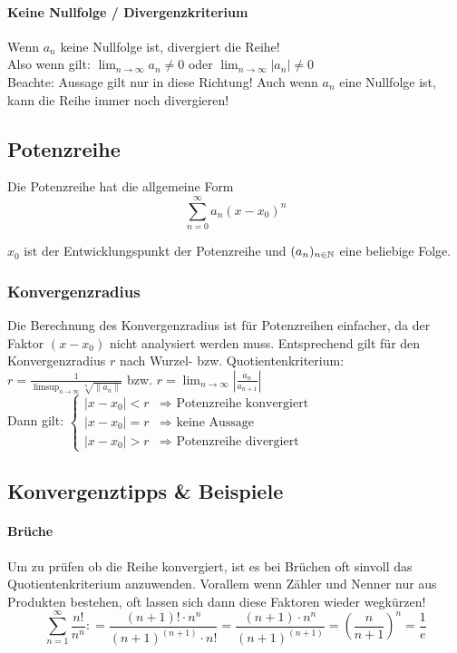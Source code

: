 \paragraph{Keine Nullfolge / Divergenzkriterium}
\vspace{-0.2cm}
Wenn $a_n$ keine Nullfolge ist, divergiert die Reihe! \\
Also wenn gilt: $\lim_{n \to \infty} a_n \neq 0$ oder $\lim_{n \to \infty} |a_n| \neq 0$ \\
Beachte: Aussage gilt nur in diese Richtung! Auch wenn $a_n$ eine Nullfolge ist, kann die Reihe immer noch divergieren!

\subsection{Potenzreihe}
\vspace{-0.2cm}
Die Potenzreihe hat die allgemeine Form
\[
\sum_{n=0}^\infty a_n (x - x_0)^n
\]

$x_0$ ist der Entwicklungspunkt der Potenzreihe und $(a_n)_{n \in \mathbb{N}}$ eine
beliebige Folge.

\subsubsection{Konvergenzradius}
\vspace{-0.2cm}
Die Berechnung des Konvergenzradius ist für Potenzreihen einfacher, da der
Faktor $(x - x_0)$ nicht analysiert werden muss. Entsprechend gilt für den
Konvergenzradius $r$ nach Wurzel- bzw. Quotientenkriterium:\\
$r = \frac{1}{\limsup_{n\to\infty} \sqrt[n]{\|a_n\|}}$ bzw.
$r = \lim_{n\to\infty} \left | \frac{a_n}{a_{n+1}} \right |$ \\
Dann gilt:
$
\begin{cases}
	|x - x_0| < r & \Rightarrow \text{ Potenzreihe konvergiert} \\
	|x - x_0| = r & \Rightarrow \text{ keine Aussage}\\
	|x - x_0| > r & \Rightarrow \text{ Potenzreihe divergiert}
\end{cases}
$

\subsection{Konvergenztipps \& Beispiele}
\vspace{-0.2cm}
\paragraph{Brüche}
\vspace{-0.2cm}
Um zu prüfen ob die Reihe konvergiert, ist es bei Brüchen oft sinvoll das Quotientenkriterium anzuwenden. Vorallem wenn Zähler und Nenner nur aus Produkten bestehen, oft lassen sich dann diese Faktoren wieder wegkürzen!
\[
	\sum_{n=1}^\infty \frac{n!}{n^n}: = \frac{(n+1)! \cdot n^n}{(n+1)^{(n+1)} \cdot n!} 
	= \frac{(n+1) \cdot n^n}{(n+1)^{(n+1)}} = \left( \frac{n}{n+1} \right)^n = \frac{1}{e}
\]


